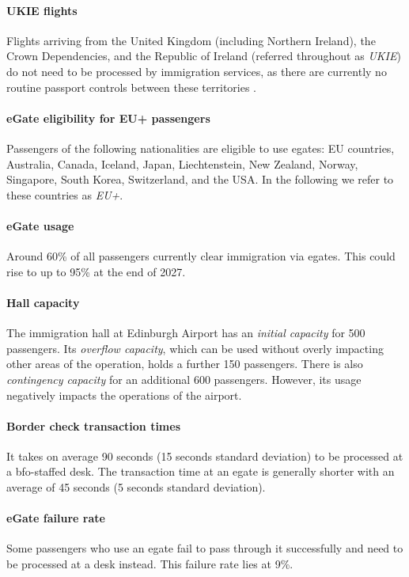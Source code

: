 \documentclass[10pt]{article}
\begin{document}
\paragraph{UKIE flights} Flights arriving from the United Kingdom (including Northern Ireland), the Crown Dependencies, and the Republic of Ireland (referred throughout as \textit{UKIE}) do not need to be processed by immigration services, as there are currently no routine passport controls between these territories \cite{common_travel_area}.

\paragraph{eGate eligibility for EU+ passengers}
Passengers of the following nationalities are eligible to use \glspl{egate}: EU countries, Australia, Canada, Iceland, Japan, Liechtenstein, New Zealand, Norway, Singapore, South Korea, Switzerland, and the USA. In the following we refer to these countries as \textit{EU+}. 

\paragraph{eGate usage}
Around 60\% of all passengers currently clear immigration via \glspl{egate}. This could rise to up to 95\% at the end of 2027.

\paragraph{Hall capacity}
The immigration hall at Edinburgh Airport has an \textit{initial capacity} for 500 passengers. Its \textit{overflow capacity}, which can be used without overly impacting other areas of the operation, holds a further 150 passengers. There is also \textit{contingency capacity} for an additional 600 passengers. However, its usage negatively impacts the operations of the airport.

\paragraph{Border check transaction times} It takes on average 90 seconds (15 seconds standard deviation) to be processed at a \gls{bfo}-staffed desk. The transaction time at an \gls{egate} is generally shorter with an average of 45 seconds (5 seconds standard deviation). 

\paragraph{eGate failure rate}
Some passengers who use an \gls{egate} fail to pass through it successfully and need to be processed at a desk instead. This failure rate lies at 9\%.
\end{document}
